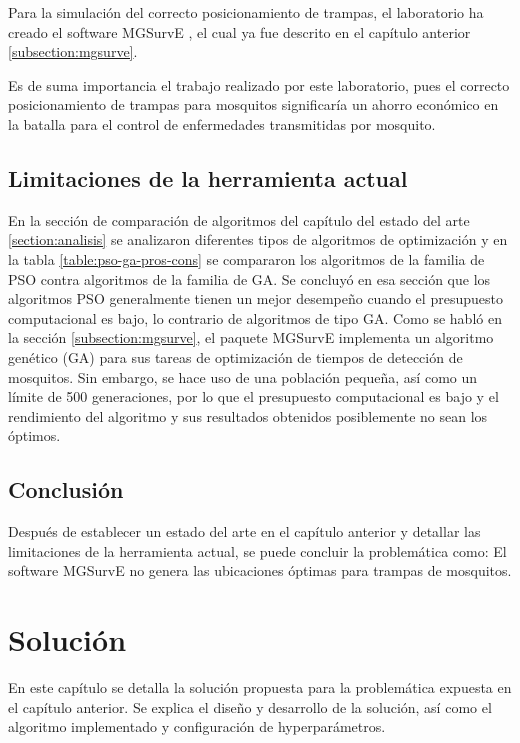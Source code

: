 \documentclass[letterpaper]{report}
\begin{document}
    Para la simulación del correcto posicionamiento de trampas, el laboratorio
    ha creado el software MGSurvE \cite{MGSurvE}, el cual ya fue descrito en el
    capítulo anterior \ref{subsection:mgsurve}.

    Es de suma importancia el trabajo realizado por este laboratorio, pues el
    correcto posicionamiento de trampas para mosquitos significaría un ahorro
    económico en la batalla para el control de enfermedades transmitidas por
    mosquito.

  \section{Limitaciones de la herramienta actual}
    En la sección de comparación de algoritmos del capítulo del
    estado del arte
    \ref{section:analisis} se analizaron diferentes tipos de algoritmos de
    optimización y en la tabla \ref{table:pso-ga-pros-cons} se compararon los
    algoritmos de la familia de PSO contra algoritmos de la familia de GA. Se
    concluyó en esa sección que los algoritmos PSO generalmente tienen un mejor
    desempeño cuando el presupuesto computacional es bajo, lo contrario de
    algoritmos de tipo GA. Como se habló en la sección \ref{subsection:mgsurve},
    el paquete MGSurvE implementa un algoritmo genético (GA) para sus tareas de
    optimización de tiempos de detección de mosquitos. Sin embargo, se hace uso
    de una población pequeña, así como un límite de 500 generaciones, por lo que
    el presupuesto computacional es bajo y el rendimiento del algoritmo y sus
    resultados obtenidos posiblemente no sean los óptimos.

  \section{Conclusión}
    Después de establecer un estado del arte en el capítulo anterior y detallar
    las limitaciones de la herramienta actual, se puede concluir la problemática
    como: El software MGSurvE no genera las ubicaciones óptimas para trampas de
    mosquitos. 

\chapter{Solución}
  En este capítulo se detalla la solución propuesta para la problemática
  expuesta en el capítulo anterior. Se explica el diseño y desarrollo de la
  solución, así como el algoritmo implementado y configuración de
  hyperparámetros.
\end{document}
